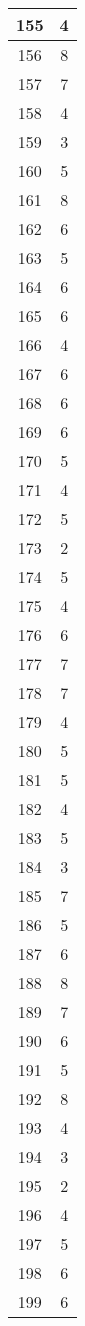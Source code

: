 \documentclass[letterpaper, 12pt]{article}
\begin{document}
\begin{longtable}{|c|c|}
\hline
155 & 4 \\
\hline
156 & 8 \\
\hline
157 & 7 \\
\hline
158 & 4 \\
\hline
159 & 3 \\
\hline
160 & 5 \\
\hline
161 & 8 \\
\hline
162 & 6 \\
\hline
163 & 5 \\
\hline
164 & 6 \\
\hline
165 & 6 \\
\hline
166 & 4 \\
\hline
167 & 6 \\
\hline
168 & 6 \\
\hline
169 & 6 \\
\hline
170 & 5 \\
\hline
171 & 4 \\
\hline
172 & 5 \\
\hline
173 & 2 \\
\hline
174 & 5 \\
\hline
175 & 4 \\
\hline
176 & 6 \\
\hline
177 & 7 \\
\hline
178 & 7 \\
\hline
179 & 4 \\
\hline
180 & 5 \\
\hline
181 & 5 \\
\hline
182 & 4 \\
\hline
183 & 5 \\
\hline
184 & 3 \\
\hline
185 & 7 \\
\hline
186 & 5 \\
\hline
187 & 6 \\
\hline
188 & 8 \\
\hline
189 & 7 \\
\hline
190 & 6 \\
\hline
191 & 5 \\
\hline
192 & 8 \\
\hline
193 & 4 \\
\hline
194 & 3 \\
\hline
195 & 2 \\
\hline
196 & 4 \\
\hline
197 & 5 \\
\hline
198 & 6 \\
\hline
199 & 6 \\
\hline
\end{longtable}
\end{document}

